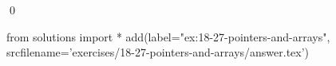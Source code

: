 
\begin{ex}
  \label{ex:18-27-pointers-and-arrays}
  
  \qed
\end{ex}
\begin{python0}
from solutions import *
add(label="ex:18-27-pointers-and-arrays",
    srcfilename='exercises/18-27-pointers-and-arrays/answer.tex')
\end{python0}
